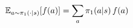 \documentclass[preview]{standalone}
\begin{document}
\begin{align*}
\special{dvisvgm:raw <g id='unique000'>}\mathbb{E}_{a \sim \pi_1(\cdot|s)}[f(a)] \special{dvisvgm:raw </g>}\special{dvisvgm:raw <g id='unique001'>}= \sum_a \pi_1(a|s)\, f(a)\special{dvisvgm:raw </g>}
\end{align*}
\end{document}
